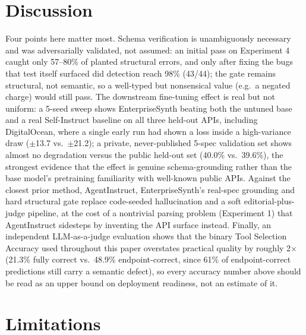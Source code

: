 \documentclass[letterpaper]{article} %
\begin{document}
\section{Discussion}

Four points here matter most. Schema verification is unambiguously necessary and was
adversarially validated, not assumed: an initial pass on Experiment 4 caught only 57--80\% of
planted structural errors, and only after fixing the bugs that test itself surfaced did detection
reach 98\% (43/44); the gate remains structural, not semantic, so a well-typed but nonsensical value
(e.g.\ a negated charge) would still pass. The downstream fine-tuning effect is real but not
uniform: a 5-seed sweep shows EnterpriseSynth beating both the untuned base and a real
Self-Instruct baseline on all three held-out APIs, including DigitalOcean, where a single early
run had shown a loss inside a high-variance draw ($\pm$13.7 vs.\ $\pm$21.2); a private,
never-published 5-spec validation set shows almost no degradation versus the public held-out set
(40.0\% vs.\ 39.6\%), the strongest evidence that the effect is genuine schema-grounding rather
than the base model's pretraining familiarity with well-known public APIs. Against the closest
prior method, AgentInstruct, EnterpriseSynth's real-spec grounding and hard structural gate
replace code-seeded hallucination and a soft editorial-plus-judge pipeline, at the cost of a
nontrivial parsing problem (Experiment 1) that AgentInstruct sidesteps by inventing the API
surface instead. Finally, an independent LLM-as-a-judge evaluation shows that the binary Tool
Selection Accuracy used throughout this paper overstates practical quality by roughly
2$\times$ (21.3\% fully correct vs.\ 48.9\% endpoint-correct, since 61\% of endpoint-correct
predictions still carry a semantic defect), so every accuracy number above should be read as an
upper bound on deployment readiness, not an estimate of it.

\section{Limitations}
\end{document}
